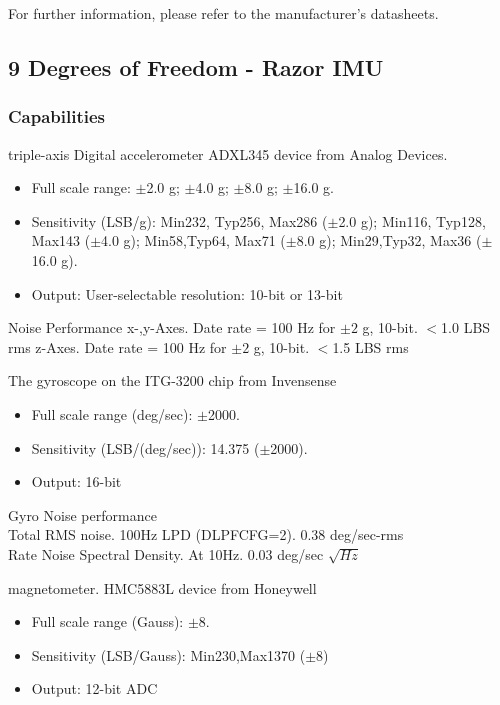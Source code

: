 For further information, please refer to the manufacturer's datasheets.



\subsection*{9 Degrees of Freedom - Razor IMU}
\subsubsection*{Capabilities}

 triple-axis Digital accelerometer ADXL345 device from Analog Devices.

\begin{itemize}
   \item Full scale range: $\pm$2.0 g; $\pm$4.0 g; $\pm$8.0 g; $\pm$16.0 g.
   \item Sensitivity (LSB/g):
 Min232, Typ256, Max286 ($\pm$2.0 g);
 Min116, Typ128, Max143 ($\pm$4.0 g);
 Min58,Typ64, Max71 ($\pm$8.0 g);
 Min29,Typ32, Max36 ($\pm$16.0 g).
 \item Output: User-selectable resolution: 10-bit or 13-bit
 \end{itemize}

 Noise Performance
 x-,y-Axes. Date rate = 100 Hz for $\pm 2$ g, 10-bit. $<$1.0 LBS rms
 z-Axes.  Date rate = 100 Hz for $\pm 2$ g, 10-bit. $<$1.5 LBS rms


 The gyroscope on the ITG-3200 chip from Invensense
\begin{itemize}
   \item Full scale range (deg/sec):  $\pm$2000.
   \item Sensitivity (LSB/(deg/sec)): 14.375 ($\pm$2000).
   \item Output: 16-bit
 \end{itemize}

 Gyro Noise performance \\
 Total RMS noise. 100Hz LPD (DLPFCFG=2). 0.38 deg/sec-rms\\
 Rate Noise Spectral Density. At 10Hz. 0.03 deg/sec $\sqrt{Hz}$



 magnetometer.  HMC5883L device from Honeywell
\begin{itemize}
   \item Full scale range (Gauss): $\pm$8.
   \item Sensitivity (LSB/Gauss): Min230,Max1370 ($\pm$8)
   \item Output: 12-bit ADC
 \end{itemize}


